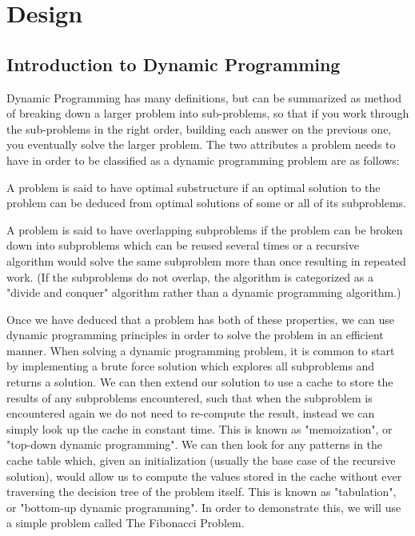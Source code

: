 \chapter{Design}

\section{Introduction to Dynamic Programming}
Dynamic Programming has many definitions, but can be summarized as method of breaking down a larger problem into sub-problems, so that if you work through the sub-problems in the right order, building each answer on the previous one, you eventually solve the larger problem.
The two attributes a problem needs to have in order to be classified as a dynamic programming problem are as follows:

\begin{definition}
    A problem is said to have optimal substructure if an optimal solution to the problem can be deduced from optimal solutions of some or all of its subproblems.
\end{definition}

\begin{definition}
    A problem is said to have overlapping subproblems if the problem can be broken down into subproblems which can be reused several times or a recursive algorithm would solve the same subproblem more than once resulting in repeated work. (If the subproblems do not overlap, the algorithm is categorized as a "divide and conquer" algorithm rather than a dynamic programming algorithm.)
\end{definition} 
Once we have deduced that a problem has both of these properties, we can use dynamic programming principles in order to solve the problem in an efficient manner.
When solving a dynamic programming problem, it is common to start by implementing a brute force solution which explores all subproblems and returns a solution.
We can then extend our solution to use a cache to store the results of any subproblems encountered, such that when the subproblem is encountered again we do not need to re-compute the result, instead we can simply look up the cache in constant time.
This is known as "memoization", or "top-down dynamic programming".
We can then look for any patterns in the cache table which, given an initialization (usually the base case of the recursive solution), would allow us to compute the values stored in the cache without ever traversing the decision tree of the problem itself.
This is known as "tabulation", or "bottom-up dynamic programming".
In order to demonstrate this, we will use a simple problem called The Fibonacci Problem.

